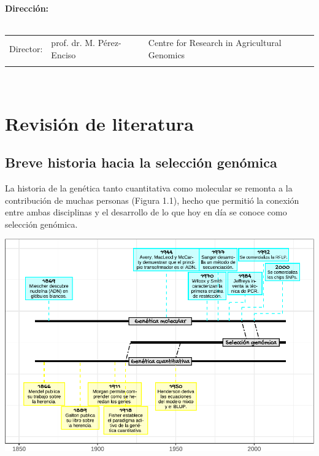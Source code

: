 \documentclass[11pt,spanish,a4paper,oneside,]{book} %
\begin{document}
\clearpage
\thispagestyle{empty}
\noindent\textbf{Dirección:}\\
\\
\noindent\begin{tabular}{@{}lll}

Director:
&  prof. dr. M. Pérez-Enciso & Centre for Research in Agricultural Genomics\\

\\
\end{tabular}\\



{
\hypersetup{linkcolor=black}
\setcounter{tocdepth}{1}
\tableofcontents
}
\mainmatter
\hypertarget{revisiuxf3n-de-literatura}{%
\chapter{Revisión de literatura}\label{revisiuxf3n-de-literatura}}

\hypertarget{breve-historia-hacia-la-selecciuxf3n-genuxf3mica}{%
\section{Breve historia hacia la selección genómica}\label{breve-historia-hacia-la-selecciuxf3n-genuxf3mica}}

La historia de la genética tanto cuantitativa como molecular se remonta a la contribución de muchas personas (Figura 1.1), hecho que permitió la conexión entre ambas disciplinas y el desarrollo de lo que hoy en día se conoce como selección genómica.

\begin{center}\includegraphics[width=1\linewidth]{figures/Crono} \end{center}
\end{document}
